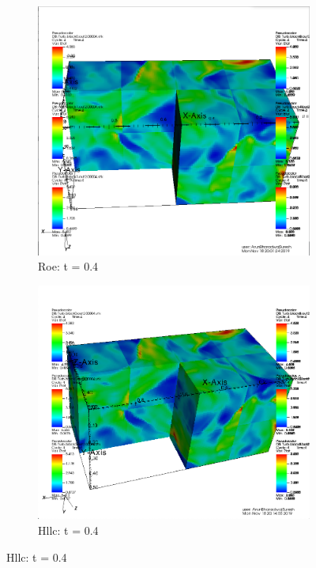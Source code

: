 \documentclass[12pt]{article}
\begin{document}
\begin{figure}[h]
	\centering
	\begin{subfigure}[h]{0.4500\textwidth}
		\centering
		\includegraphics[width=\textwidth]{roet4.png}
		\caption{Roe: t = 0.4}
	\end{subfigure}
	\begin{subfigure}[h]{0.4500\textwidth}
		\centering
		\includegraphics[width=\textwidth]{hllct4.png}
		\caption{Hllc: t = 0.4}
	\end{subfigure}
\end{figure}\\\\
\end{document}

